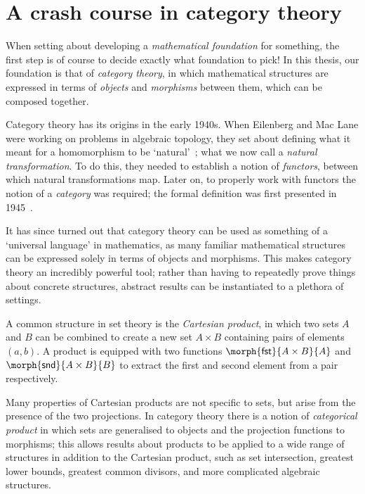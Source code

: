 \chapter{A crash course in category theory}

When setting about developing a \emph{mathematical foundation} for something,
the first step is of course to decide exactly what foundation to pick!
In this thesis, our foundation is that of \emph{category theory}, in which
mathematical structures are expressed in terms of \emph{objects} and
\emph{morphisms} between them, which can be composed together.

Category theory has its origins in the early 1940s.
When Eilenberg and Mac Lane were working on problems in algebraic topology, they
set about defining what it meant for a homomorphism to be
`natural'~\cite{eilenberg1942natural}; what we now call a
\emph{natural transformation}.
To do this, they needed to establish a notion of \emph{functors}, between which
natural transformations map.
Later on, to properly work with functors the notion of a \emph{category} was
required; the formal definition was first presented in
1945~\cite{eilenberg1945general}.

It has since turned out that category theory can be used as something of a
`universal language' in mathematics, as many familiar mathematical structures
can be expressed solely in terms of objects and morphisms.
This makes category theory an incredibly powerful tool; rather than having to
repeatedly prove things about concrete structures, abstract results can be
instantiated to a plethora of settings.

\begin{example}
    A common structure in set theory is the \emph{Cartesian product}, in
    which two sets \(A\) and \(B\) can be combined to create a new set
    \(A \times B\) containing pairs of elements \((a,b)\).
    A product is equipped with two functions
    \(\morph{\mathsf{fst}}{A \times B}{A}\) and
    \(\morph{\mathsf{snd}}{A \times B}{B}\) to extract the first and second
    element from a pair respectively.

    Many properties of Cartesian products are not specific to sets,
    but arise from the presence of the two projections.
    In category theory there is a notion of \emph{categorical product} in which
    sets are generalised to objects and the projection functions to morphisms;
    this allows results about products to be applied to a wide range of
    structures in addition to the Cartesian product, such as set intersection,
    greatest lower bounds, greatest common divisors, and more complicated
    algebraic structures.
\end{example}

